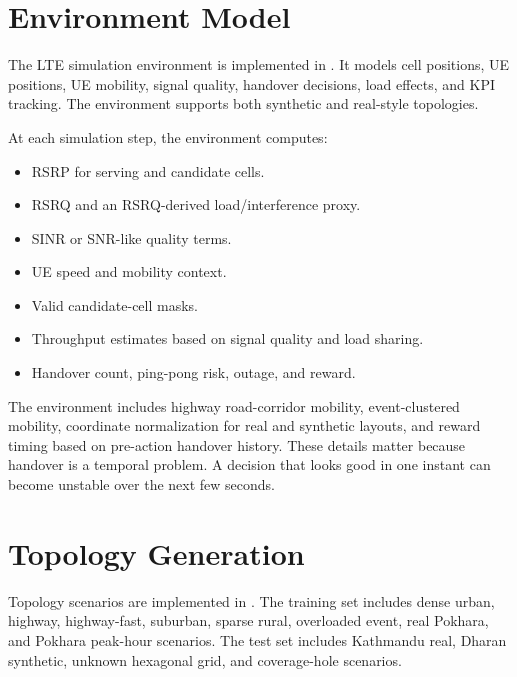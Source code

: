 \documentclass[12pt,a4paper]{report}
\begin{document}
\section{Environment Model}
The LTE simulation environment is implemented in . It models cell positions, UE positions, UE mobility, signal quality, handover decisions, load effects, and KPI tracking. The environment supports both synthetic and real-style topologies.

At each simulation step, the environment computes:
\begin{itemize}
    \item RSRP for serving and candidate cells.
    \item RSRQ and an RSRQ-derived load/interference proxy.
    \item SINR or SNR-like quality terms.
    \item UE speed and mobility context.
    \item Valid candidate-cell masks.
    \item Throughput estimates based on signal quality and load sharing.
    \item Handover count, ping-pong risk, outage, and reward.
\end{itemize}

The environment includes highway road-corridor mobility, event-clustered mobility, coordinate normalization for real and synthetic layouts, and reward timing based on pre-action handover history. These details matter because handover is a temporal problem. A decision that looks good in one instant can become unstable over the next few seconds.

\section{Topology Generation}
Topology scenarios are implemented in . The training set includes dense urban, highway, highway-fast, suburban, sparse rural, overloaded event, real Pokhara, and Pokhara peak-hour scenarios. The test set includes Kathmandu real, Dharan synthetic, unknown hexagonal grid, and coverage-hole scenarios.
\end{document}
